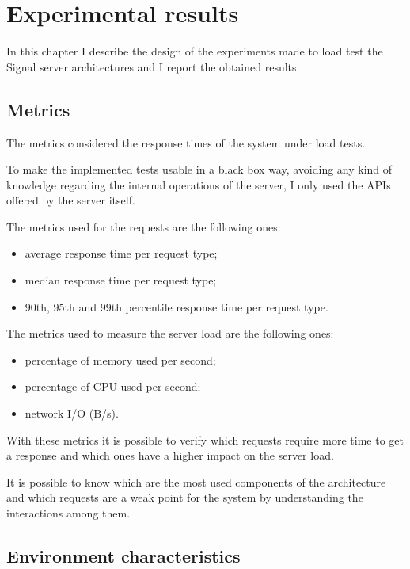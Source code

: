 \chapter{Experimental results\label{sec:experimentalresults}}

In this chapter I describe the design of the experiments made to load test the Signal server architectures and I report the obtained results.

\section{Metrics\label{sec:metrics}}

The metrics considered the response times of the system under load tests.

To make the implemented tests usable in a black box way, avoiding any kind of knowledge regarding the internal operations of the server, I only used the APIs offered by the server itself.

The metrics used for the requests are the following ones:
\begin{itemize}
    \item average response time per request type;
    \item median response time per request type;
    \item 90th, 95th and 99th percentile response time per request type.
\end{itemize}

The metrics used to measure the server load are the following ones:
\begin{itemize}
    \item percentage of memory used per second;
    \item percentage of CPU used per second;
    \item network I/O (B/s).
\end{itemize}

With these metrics it is possible to verify which requests require more time to get a response and which ones have a higher impact on the server load.

It is possible to know which are the most used components of the architecture and which requests are a weak point for the system by understanding the interactions among them.



\section{Environment characteristics\label{sec:environment}}

